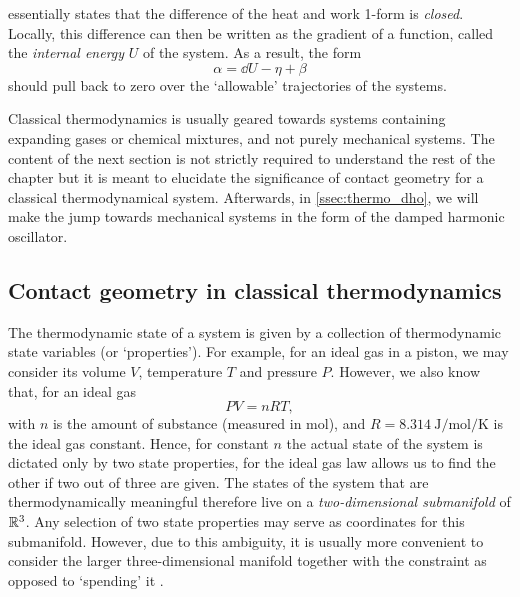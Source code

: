  essentially states that the difference of the heat and work 1-form is \emph{closed}. Locally, this difference can then be written as the gradient of a function, called the \emph{internal energy} $U$ of the system. As a result, the form 
$$ \alpha = \dd{U} - \eta + \beta $$
should pull back to zero over the `allowable' trajectories of the systems.

Classical thermodynamics is usually geared towards systems containing expanding gases or chemical mixtures, and not purely mechanical systems. The content of the next section is not strictly required to understand the rest of the chapter but it is meant to elucidate the significance of contact geometry for a classical thermodynamical system. Afterwards, in \cref{ssec:thermo_dho}, we will make the jump towards mechanical systems in the form of the damped harmonic oscillator.

\subsection{Contact geometry in classical thermodynamics} 
The thermodynamic state of a system is given by a collection of thermodynamic state variables (or `properties'). For example, for an ideal gas in a piston, we may consider its volume $V$, temperature $T$ and pressure $P$. However, we also know that, for an ideal gas
\begin{equation}
    PV = nRT,
    \label{eq:ideal_gas}
\end{equation}
with $n$ is the amount of substance (measured in \si{\mole}), and $R = \SI{8.314}{\joule \per \mole \per \kelvin}$ is the ideal gas constant.  Hence, for constant $n$ the actual state of the system is dictated only by two state properties, for the ideal gas law allows us to find the other if two out of three are given. The states of the system that are thermodynamically meaningful therefore live on a \emph{two-dimensional submanifold} of $\mathbb{R}^3$. Any selection of two state properties may serve as coordinates for this submanifold. However, due to this ambiguity, it is usually more convenient to consider the larger three-dimensional manifold together with the constraint as opposed to `spending' it \cite{Balian2001, Giancoli2014}.

